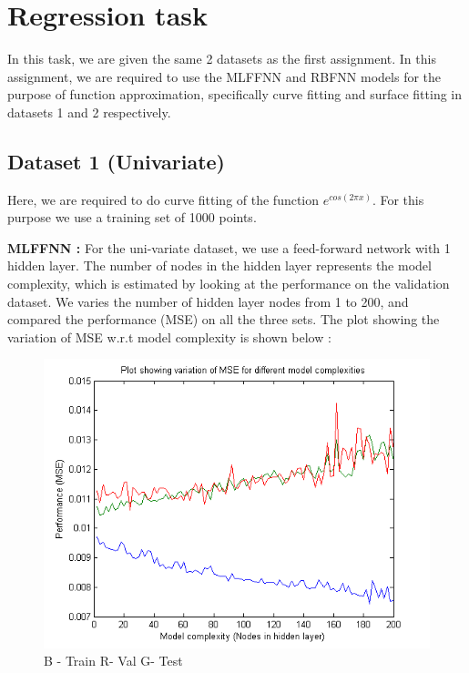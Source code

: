 \documentclass{article}
\begin{document}
\section{Regression task}
In this task, we are given the same 2 datasets as the first assignment. In this assignment, we are required to use the MLFFNN and RBFNN models for the purpose of function approximation, specifically curve fitting and surface fitting in datasets 1 and 2 respectively.

\subsection{Dataset 1 (Univariate)}
\begin{flushleft}
Here, we are required to do curve fitting of the function $e^{cos(2 \pi x)}$. For this purpose we use a training set of 1000 points.



\end{flushleft}


\begin{flushleft}
\textbf{MLFFNN :}
For the uni-variate dataset, we use a feed-forward network with 1 hidden layer. The number of nodes in the hidden layer represents the model complexity, which is estimated by looking at the performance on the validation dataset. We varies the number of hidden layer nodes from 1 to 200, and compared the performance   (MSE) on all the three sets. The plot showing the variation of MSE w.r.t model complexity is shown below :

\end{flushleft}


\begin{figure}[H]
\centering
\includegraphics[width=\linewidth]{Regression/univariate/mse.png}
\caption{B - Train  R- Val G- Test}
\end{figure}
\end{document}
